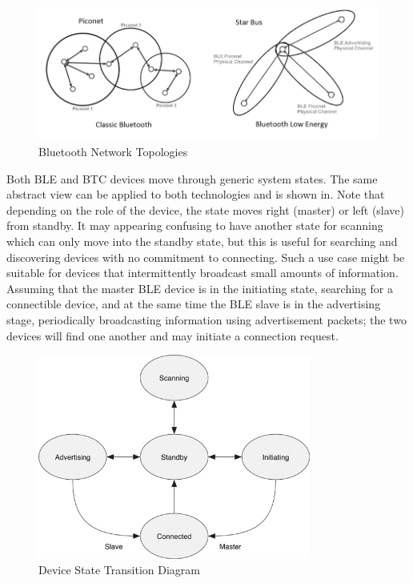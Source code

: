 \documentclass[]{article}
\begin{document}
\begin{figure}[htb]
	\begin{center}
		\includegraphics[width = \textwidth]{topology}
	\end{center}
	\caption{Bluetooth Network Topologies }
	\label{fig:topology}
\end{figure}

Both BLE and BTC devices move through generic system states. The same abstract view can be applied to both technologies and is shown in. Note that depending on the role of the device, the state moves right (master) or left (slave) from standby. It may appearing confusing to have another state for scanning which can only move into the standby state, but this is useful for searching and discovering devices with no commitment to connecting. Such a use case might be suitable for devices that intermittently broadcast small amounts of information. Assuming that the master BLE device is in the initiating state, searching for a connectible device, and at the same time the BLE slave is in the advertising stage, periodically broadcasting information using advertisement packets; the two devices will find one another and may initiate a connection request.

\begin{figure}[h]
	\begin{center}
		\includegraphics[width = 0.8\textwidth]{systemstate}
	\end{center}
	\caption{Device State Transition Diagram}
	\label{fig:systemstate}
\end{figure}
\end{document}
